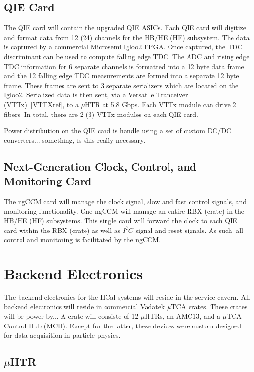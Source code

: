 \documentclass[11pt]{article} %
\begin{document}
\subsection{QIE Card}

The QIE card will contain the upgraded QIE ASICs.  Each QIE card will digitize and format data from 12 (24)
channels for the HB/HE (HF) subsystem.  The data is captured by a commercial Microsemi Igloo2 FPGA.  
Once captured, the TDC discriminant can be used to compute falling edge TDC.  The ADC and rising edge
TDC information for 6 separate channels is formatted into a 12 byte data frame and the 12 falling edge TDC 
measurements are formed into a separate 12 byte frame.  These frames are sent to 3 separate serializers 
which are located on the Igloo2.  Serialized data is then sent, via a Versatile Tranceiver (VTTx)~\ref{VTTXref}, 
to a $\mu$HTR at 5.8 Gbps.  Each VTTx module can drive 2 fibers.  In total, there are 2 (3) VTTx modules 
on each QIE card.  

Power distribution on the QIE card is handle using a set of custom DC/DC converters... something, is this 
really necessary.

\subsection{Next-Generation Clock, Control, and Monitoring Card}

The ngCCM card will manage the clock signal, slow and fast control signals, and monitoring functionality.  One 
ngCCM will manage an entire RBX (crate) in the HB/HE (HF) subsystems.  This single card will forward the clock
to each QIE card within the RBX (crate) as well as $I^2C$ signal and reset signals.  As such, all control and 
monitoring is facilitated by the ngCCM.  

\section{Backend Electronics}

The backend electronics for the HCal systems will reside in the service cavern.  All backend electronics will
reside in commercial Vadatek $\mu$TCA crates.  These crates will be power by... A crate will consiste of 12 
$\mu$HTRs, an AMC13, and a $\mu$TCA Control Hub (MCH).  Except for the latter, these devices were custom
designed for data acquisition in particle physics.

\subsection{$\mu$HTR}
\end{document}
